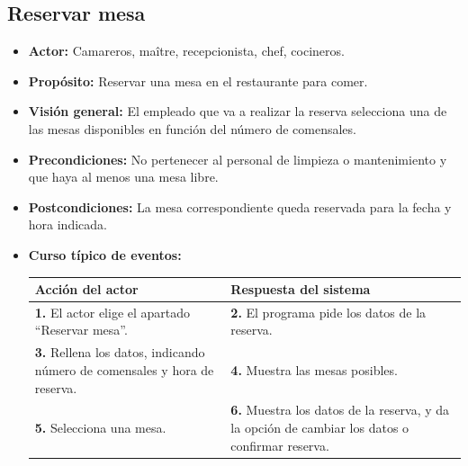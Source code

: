 \documentclass[spanish,a4paper,11pt, twoside]{report}	%
\begin{document}
		\subsection{Reservar mesa} 
			\begin{itemize}
			\item \textbf{Actor:} Camareros, maître, recepcionista, chef, cocineros.
			\item \textbf{Propósito:} Reservar una mesa en el restaurante para comer.
			\item \textbf{Visión general:} El empleado que va a realizar la reserva
					selecciona una de las mesas disponibles en función del número de comensales.
			\item \textbf{Precondiciones:} No pertenecer al personal de limpieza o
					mantenimiento y que haya al menos una mesa libre.
			\item \textbf{Postcondiciones:} La mesa correspondiente queda reservada para la
					fecha y hora indicada.
			\item \textbf{Curso típico de eventos:} 	\\
				\begin{tabular}{|p{6cm}||p{6cm}|}
				\hline
				\textbf{Acción del actor} & \textbf{Respuesta del sistema} \\ \hline \hline
				  \textbf{1.} El actor elige el apartado ``Reservar mesa''. &
				  \textbf{2.} El programa pide los datos de la reserva.		\\ \hline
				  \textbf{3.} Rellena los datos, indicando número de comensales y hora de reserva. &
				  \textbf{4.} Muestra las mesas posibles.	\\ \hline
				  \textbf{5.} Selecciona una mesa. &
				  \textbf{6.} Muestra los datos de la reserva, y da la opción de cambiar los datos o confirmar reserva.	
				  	\\ \hline
			\end{tabular}
			\\
		\end {itemize}
		
\end{document}
